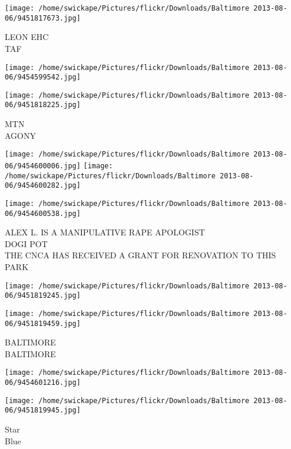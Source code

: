 \documentclass[10pt,letterpaper]{article}
\begin{document}
\vspace{0.25in}
\texttt{[image: /home/swickape/Pictures/flickr/Downloads/Baltimore 2013-08-06/9451817673.jpg]}

LEON EHC\\
TAF\\
\pagebreak

\texttt{[image: /home/swickape/Pictures/flickr/Downloads/Baltimore 2013-08-06/9454599542.jpg]}

\vspace{0.25in}
\texttt{[image: /home/swickape/Pictures/flickr/Downloads/Baltimore 2013-08-06/9451818225.jpg]}

MTN\\
AGONY\\
\pagebreak

\texttt{[image: /home/swickape/Pictures/flickr/Downloads/Baltimore 2013-08-06/9454600006.jpg]}
\texttt{[image: /home/swickape/Pictures/flickr/Downloads/Baltimore 2013-08-06/9454600282.jpg]}

\vspace{0.25in}
\texttt{[image: /home/swickape/Pictures/flickr/Downloads/Baltimore 2013-08-06/9454600538.jpg]}

ALEX L. IS A MANIPULATIVE RAPE APOLOGIST\\
DOGI POT\\
THE CNCA HAS RECEIVED A GRANT FOR RENOVATION TO THIS PARK\\
\pagebreak

\texttt{[image: /home/swickape/Pictures/flickr/Downloads/Baltimore 2013-08-06/9451819245.jpg]}

\vspace{0.25in}
\texttt{[image: /home/swickape/Pictures/flickr/Downloads/Baltimore 2013-08-06/9451819459.jpg]}

BALTIMORE\\
BALTIMORE\\
\pagebreak

\texttt{[image: /home/swickape/Pictures/flickr/Downloads/Baltimore 2013-08-06/9454601216.jpg]}

\vspace{0.25in}
\texttt{[image: /home/swickape/Pictures/flickr/Downloads/Baltimore 2013-08-06/9451819945.jpg]}

Star\\
Blue\\
\pagebreak
\end{document}
